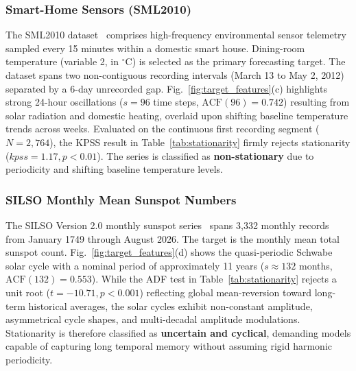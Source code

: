 \subsubsection{Smart-Home Sensors (SML2010)}
The SML2010 dataset~\cite{sml2010} comprises high-frequency environmental sensor
telemetry sampled every 15 minutes within a domestic smart house. Dining-room
temperature (variable 2, in $^\circ\text{C}$) is selected as the primary
forecasting target. The dataset spans two non-contiguous recording intervals
(March 13 to May 2, 2012) separated by a 6-day unrecorded gap.
Fig.~\ref{fig:target_features}(c) highlights strong 24-hour oscillations
($s = 96$ time steps, $\text{ACF}(96) = 0.742$) resulting from solar
radiation and domestic heating, overlaid upon shifting baseline temperature
trends across weeks. Evaluated on the continuous first recording segment
($N = 2,764$), the KPSS result in Table~\ref{tab:stationarity} firmly rejects
stationarity ($kpss = 1.17, p < 0.01$). The series is classified as
\textbf{non-stationary} due to periodicity and shifting baseline
temperature levels.

\subsubsection{SILSO Monthly Mean Sunspot Numbers}
The SILSO Version 2.0 monthly sunspot series~\cite{silso_sunspots} spans 3,332
monthly records from January 1749 through August 2026. The target is the monthly
mean total sunspot count. Fig.~\ref{fig:target_features}(d) shows the
quasi-periodic Schwabe solar cycle with a nominal period of approximately 11
years ($s \approx 132$ months, $\text{ACF}(132) = 0.553$). While the ADF test in
Table~\ref{tab:stationarity} rejects a unit root ($t = -10.71, p < 0.001$)
reflecting global mean-reversion toward long-term historical averages, the solar
cycles exhibit non-constant amplitude, asymmetrical cycle shapes, and
multi-decadal amplitude modulations. Stationarity
is therefore classified as \textbf{uncertain and cyclical}, demanding models
capable of capturing long temporal memory without assuming rigid harmonic
periodicity.


